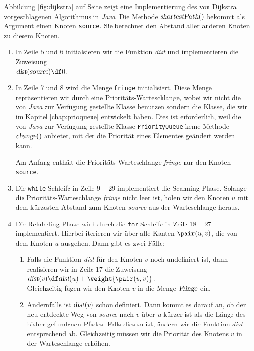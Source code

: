 \noindent 
Abbildung \ref{fig:dijkstra} auf Seite \pageref{fig:dijkstra} zeigt eine
Implementierung des von Dijkstra vorgeschlagenen Algorithmus in \textsl{Java}.
Die Methode $\textsl{shortestPath}()$ bekommt als Argument einen Knoten \texttt{source}.
Sie berechnet den Abstand aller anderen Knoten zu diesem Knoten.
\begin{enumerate}
\item In Zeile 5 und 6 initialsieren wir  die Funktion \textsl{dist} und
      implementieren die Zuweisung \\[0.2cm]
      \hspace*{1.3cm} $\textsl{dist}(\textsl{source}) \df 0$.
\item In Zeile 7 und 8 wird die Menge \texttt{fringe} initialisiert. 
      Diese Menge repr\"asentieren wir durch eine Priorit\"ats-Warteschlange,
      wobei wir nicht die von \textsl{Java} zur Verf\"ugung gestellte Klasse benutzen
      sondern die Klasse, die wir im Kapitel \ref{chap:prioqueue}
      entwickelt haben.  Dies ist erforderlich, weil die von \textsl{Java} zur Verf\"ugung
      gestellte Klasse \texttt{PriorityQueue} keine Methode $\textsl{change}()$ anbietet,
      mit der die Priorit\"at eines Elementes ge\"andert werden kann.

      Am Anfang enth\"alt die Priorit\"ats-Warteschlange \textsl{fringe} nur den Knoten \texttt{source}.
\item Die \texttt{while}-Schleife in Zeile 9 -- 29 implementiert die Scanning-Phase.
      Solange die Priorit\"ats-Warteschlange \textsl{fringe} nicht leer ist,
      holen wir den Knoten $u$ mit dem k\"urzesten Abstand zum Knoten \textsl{source}
      aus der Warteschlange heraus.
\item Die Relabeling-Phase wird durch die \texttt{for}-Schleife in Zeile 18 -- 27
      implementiert.  Hierbei iterieren wir \"uber alle Kanten $\pair(u,v)$, die
      von dem Knoten $u$ ausgehen.  Dann gibt es zwei F\"alle:
      \begin{enumerate}
      \item Falls die Funktion \textsl{dist} f\"ur den Knoten $v$ noch undefiniert
            ist, dann realisieren wir in Zeile 17 die Zuweisung \\[0.2cm]
            \hspace*{1.3cm} $\textsl{dist}(v) \df \textsl{dist}(u) + \weight{\pair(u,v)}$.
            \\[0.2cm]
            Gleichzeitig f\"ugen wir den Knoten $v$ in die Menge $\textsl{Fringe}$ ein.
      \item Andernfalls ist $\textsl{dist}(v)$ schon definiert.  Dann kommt es
            darauf an, ob der neu entdeckte Weg von \textsl{source} nach $v$
            \"uber $u$ k\"urzer ist als die L\"ange des bisher gefundenen Pfades.
            Falls dies so ist, \"andern wir die Funktion \textsl{dist}
            entsprechend ab.  Gleichzeitig m\"ussen wir die Priorit\"at des Knotens
            $v$ in der Warteschlange erh\"ohen.
      \end{enumerate}
\end{enumerate}

